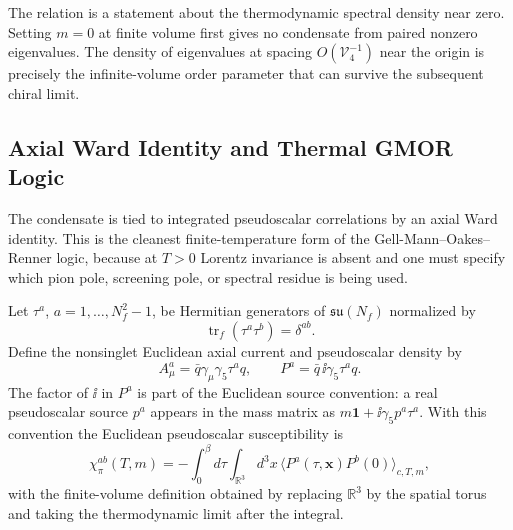 \begin{remark}
The relation is a statement about the thermodynamic spectral density near
zero.  Setting \(m=0\) at finite volume first gives no condensate from paired
nonzero eigenvalues.  The density of eigenvalues at spacing
\(O(\mathcal V_4^{-1})\) near the origin is precisely the infinite-volume
order parameter that can survive the subsequent chiral limit.
\end{remark}

\subsection{Axial Ward Identity and Thermal GMOR Logic}
\label{subsec:qcd-thermal-axial-ward-gmor}

The condensate is tied to integrated pseudoscalar correlations by an axial
Ward identity.  This is the
cleanest finite-temperature form of the Gell-Mann--Oakes--Renner logic,
because at \(T>0\) Lorentz invariance is absent and one must specify which
pion pole, screening pole, or spectral residue is being used.

Let \(\tau^a\), \(a=1,\ldots,N_f^2-1\), be Hermitian generators of
\(\mathfrak{su}(N_f)\) normalized by
\begin{equation}
  \operatorname{tr}_{f}(\tau^a\tau^b)=\delta^{ab}.
  \label{eq:qcd-flavor-generator-normalization}
\end{equation}
Define the nonsinglet Euclidean axial current and pseudoscalar density by
\begin{equation}
  A_\mu^a=\bar q\gamma_\mu\gamma_5\tau^a q,
  \qquad
  P^a=\bar q\,\ii\gamma_5\tau^a q .
  \label{eq:qcd-axial-current-pseudoscalar-density}
\end{equation}
The factor of \(\ii\) in \(P^a\) is part of the Euclidean source convention:
a real pseudoscalar source \(p^a\) appears in the mass matrix as
\(m\mathbf1+\ii\gamma_5p^a\tau^a\).  With this convention the Euclidean
pseudoscalar susceptibility is
\begin{equation}
  \chi_\pi^{ab}(T,m)
  =
  -\int_0^\beta d\tau\int_{\mathbb R^3}d^3x\,
  \langle P^a(\tau,\mathbf x)P^b(0)\rangle_{c,T,m},
  \label{eq:qcd-pseudoscalar-susceptibility-definition}
\end{equation}
with the finite-volume definition obtained by replacing \(\mathbb R^3\) by
the spatial torus and taking the thermodynamic limit after the integral.


